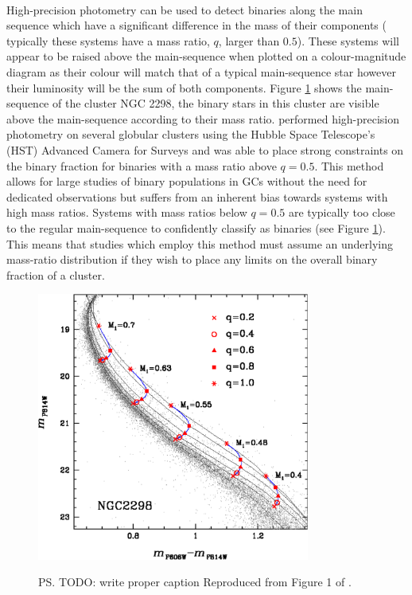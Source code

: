 \paragraph{}
High-precision photometry can be used to detect binaries along the main sequence which have a
significant difference in the mass of their components ( typically these systems have a mass ratio,
$q$, larger than $0.5$). These systems will appear to be raised above the main-sequence when plotted
on a colour-magnitude diagram as their colour will match that of a typical main-sequence star
however their luminosity will be the sum of both components. Figure
\ref{fig:1/main_sequence_binaries} shows the main-sequence of the cluster NGC 2298, the binary stars
in this cluster are visible above the main-sequence according to their mass ratio.
\citet{Milone2012} performed high-precision photometry on several globular clusters using the Hubble
Space Telescope's (HST) Advanced Camera for Surveys and was able to place strong constraints on the
binary fraction for binaries with a mass ratio above $q=0.5$. This method allows for large studies
of binary populations in GCs without the need for dedicated observations but suffers from an
inherent bias towards systems with high mass ratios. Systems with mass ratios below $q=0.5$ are
typically too close to the regular main-sequence to confidently classify as binaries (see Figure
\ref{fig:1/main_sequence_binaries}). This means that studies which employ this method must assume an
underlying mass-ratio distribution if they wish to place any limits on the overall binary fraction
of a cluster.


\begin{figure}
	\centering
	\includegraphics[width=0.8\textwidth]{"./figures/main_sequence_binaries.pdf"}
	\label{fig:1/main_sequence_binaries}
\caption{\ps{TODO: write proper caption} Reproduced from Figure 1 of \citet{Milone2012}.}
\end{figure}


